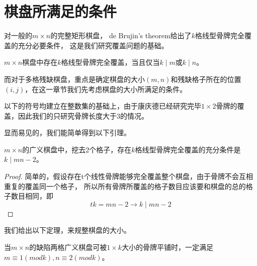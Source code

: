 \chapter{棋盘所满足的条件}

对一般的$m \times n$的完整矩形棋盘， de Brujin's theorem\cite{fengBasicTheorem}给出了$k$格线型骨牌完全覆盖的充分必要条件， 这是我们研究覆盖问题的基础。

\begin{lemma}
    \label{basic-lemma-1}
    $m \times n$棋盘中存在$k$格线型骨牌完全覆盖，当且仅当$k \mid m$或$k \mid n$。
\end{lemma}

而对于多格残缺棋盘，重点是确定棋盘的大小$(m, n)$和残缺格子所在的位置$(i, j)$，在这一章节我们先考虑棋盘的大小所满足的条件。

以下的符号均建立在整数集的基础上，由于康庆德已经研究完毕$1 \times 2$骨牌的覆盖\cite{ZRZZ199205013}，因此我们的只研究骨牌长度大于3的情况。

显而易见的，我们能简单得到以下引理。
\begin{lemma}
    \label{basic-lemma-2}
    $m \times n$的广义棋盘中，挖去2个格子，存在$k$格线型骨牌完全覆盖的充分条件是$k \mid mn - 2$。
\end{lemma}
\begin{proof}
    简单的，假设存在t个线性骨牌能够完全覆盖整个棋盘，由于骨牌不会互相重复的覆盖同一个格子，
    所以所有骨牌所覆盖的格子数目应该要和棋盘的总的格子数目相同，即
    \begin{equation}
        tk = mn - 2 \rightarrow k \mid mn - 2
    \end{equation}
\end{proof}
我们给出以下定理，来规整棋盘的大小。
\begin{theorem}
    \label{basic-theorem-1}
    当$m \times n$的缺陷两格广义棋盘可被$1 \times k$大小的骨牌平铺时，一定满足$m \equiv 1 (mod k), n \equiv 2 (mod k)$。
\end{theorem}

